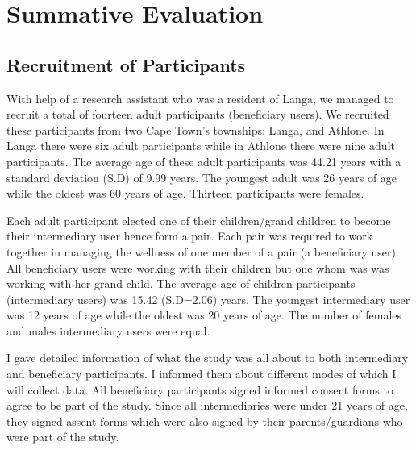 
\chapter{Summative Evaluation} %

\label{summativeevalchapter} %


\section{Recruitment of Participants}
With help of a research assistant who was a resident of Langa,  we managed to recruit a total of fourteen adult participants (beneficiary users). We recruited these participants from two Cape Town's townships: Langa, and Athlone. In Langa there were six adult participants while in Athlone there were nine adult participants. The average age of these adult participants was 44.21 years with a standard deviation (S.D) of 9.99 years. The youngest adult was 26 years of age while the oldest was 60 years of age. Thirteen participants were females. 

Each adult participant elected one of their children/grand children to become their intermediary user hence form a pair. Each pair was required to work together in managing the wellness of one member of a pair (a beneficiary user). All beneficiary users were working with their children but one whom was was working with her grand child.  The average age of children participants (intermediary users) was 15.42 (S.D=2.06) years. The youngest intermediary user was 12 years of age while the oldest was 20 years of age. The number of females and males intermediary users were equal. 

I gave detailed information of what the study was all about to both intermediary and beneficiary participants. I informed them about different modes of which I will collect data. All beneficiary participants signed informed consent forms to agree to be part of the study. Since all intermediaries were under 21 years of age, they signed assent forms which were also signed by their parents/guardians who were part of the study.

